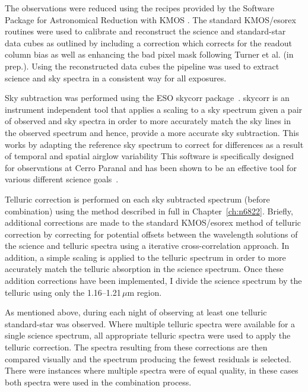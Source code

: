 The observations were reduced using the recipes provided by the Software Package for Astronomical Reduction with KMOS
\citep[SPARK;][]{2013A&A...558A..56D}.
The standard KMOS/esorex routines were used to calibrate and reconstruct the science and standard-star data cubes as outlined by
\cite{2013A&A...558A..56D} including a correction which corrects for the readout column bias as well as enhancing the bad pixel mask following Turner et al. (in prep.).
Using the reconstructed data cubes the pipeline was used to extract science and sky spectra in a consistent way for all exposures.

Sky subtraction was performed using the ESO {\sc skycorr} package~\citep{2014A&A...567A..25N}.
{\sc skycorr} is an instrument independent tool that applies a scaling to a sky spectrum given a pair of observed and sky spectra in order to more accurately match the sky lines in the observed spectrum and hence, provide a more accurate sky subtraction.
This works by adapting the reference sky spectrum to correct for differences as a result of temporal and spatial airglow variability
This software is specifically designed for observations at Cerro Paranal and has been shown to be an effective tool for various different science goals~\citep[e.g.][]{2014A&A...567A..25N,2015ApJ...805..182G,2016MNRAS.455.2028F,2016MNRAS.457.1468L}.

Telluric correction is performed on each sky subtracted spectrum (before combination) using the method described in full in Chapter~\ref{ch:n6822}.
Briefly, additional corrections are made to the standard KMOS/esorex method of telluric correction by correcting for potential offsets between the wavelength solutions of the science and telluric spectra using a iterative cross-correlation approach.
In addition, a simple scaling is applied to the telluric spectrum in order to more accurately match the telluric absorption in the science spectrum.
Once these addition corrections have been implemented, I divide the science spectrum by the telluric using only the 1.16--1.21\,$\mu$m region.


As mentioned above, during each night of observing at least one telluric standard-star was observed.
Where multiple telluric spectra were available for a single science spectrum, all appropriate telluric spectra were used to apply the telluric correction.
The spectra resulting from these corrections are then compared visually and the spectrum producing the fewest residuals is selected.
There were instances where multiple spectra were of equal quality, in these cases both spectra were used in the combination process.

